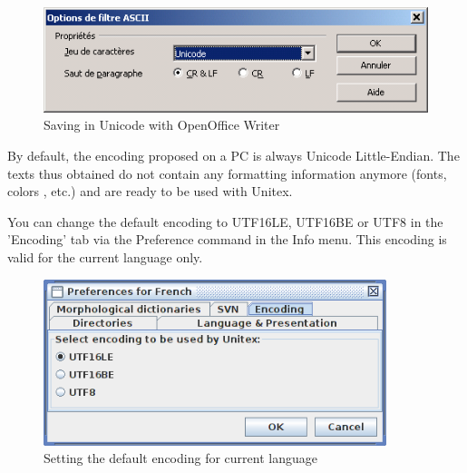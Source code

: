 \begin{figure}[!h]
\begin{center}
\includegraphics[width=12.5cm]{resources/img/fig2-4.png}
\caption{\label{OfficeWriter}Saving in Unicode with OpenOffice Writer}
\end{center}
\end{figure}

\noindent By default, the encoding proposed on a PC is always Unicode
Little-Endian. The texts thus obtained do not contain any formatting information anymore (fonts,
colors , etc.) and are ready to be used with Unitex.

\bigskip
\noindent 
You can change the default encoding to UTF16LE, UTF16BE or UTF8 in the 'Encoding' tab via the Preference  command in the Info menu. This encoding is valid for the current language only.

\begin{figure}[!h]
\begin{center}
\includegraphics[width=10cm]{resources/img/fig2-5.png}
\caption{\label{OfficeWriter}Setting the default encoding for current language}
\end{center}
\end{figure}

